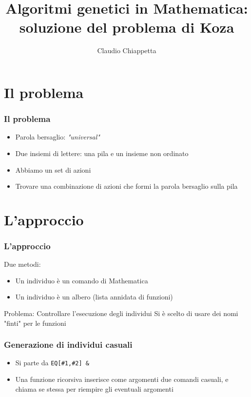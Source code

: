 \documentclass{beamer} %
\title{Algoritmi genetici in Mathematica: soluzione del problema di Koza}
\author{Claudio Chiappetta}
\institute{Università degli studi di Milano}
\date{}%
\begin{document}



\begin{frame}
\titlepage 
\end{frame}

\section{Il problema}
\begin{frame}
\frametitle{Il problema}

\begin{itemize}
\item Parola bersaglio: \emph{"universal"}
\item Due insiemi di lettere: una pila e un insieme non ordinato
\item Abbiamo un set di azioni
\item Trovare una combinazione di azioni che formi la parola bersaglio sulla pila
\end{itemize}
\end{frame}

\section{L'approccio}
\begin{frame}
\frametitle{L'approccio}

Due metodi: 
\begin{itemize}
\item Un individuo è un comando di Mathematica
\item Un individuo è un albero (lista annidata di funzioni)
\end{itemize}

\begin{block}{Problema: Controllare l'esecuzione degli individui}
Si è scelto di usare dei nomi "finti" per le funzioni
\end{block}

\end{frame}

\begin{frame}
\frametitle{Generazione di individui casuali}

\begin{itemize}
\item Si parte da \texttt{EQ[\#1,\#2] \&}
\item Una funzione ricorsiva inserisce come argomenti due comandi casuali, e chiama se stessa per riempire gli eventuali argomenti
\end{itemize}

\end{frame}
\end{document}
